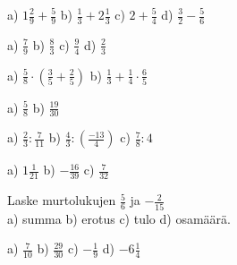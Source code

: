 \begin{tehtava}
a) $1\frac{2}{9}+\frac{5}{9}$ \qquad b) $\frac{1}{3}+2\frac{1}{3}$ \qquad c) $2+\frac{5}{4}$ \qquad
d) $ \frac{3}{2}-\frac{5}{6}$
\begin{vastaus}
a) $\frac{7}{9}$ \qquad b) $\frac{8}{3}$ \qquad c) $\frac{9}{4}$ \qquad d) $\frac{2}{3}$
\end{vastaus}
\end{tehtava}


\begin{tehtava}
a) $\frac{5}{8}\cdot(\frac{3}{5}+\frac{2}{5})$ \qquad b) $\frac{1}{3}+\frac{1}{4}\cdot\frac{6}{5}$
\begin{vastaus}
a) $\frac{5}{8}$ \qquad b) $\frac{19}{30}$
\end{vastaus}
\end{tehtava}


\begin{tehtava}
a) $\frac{2}{3} : \frac{7}{11}$ \qquad b) $\frac{4}{3}:(\frac{-13}{4})$ \qquad c) $\frac{7}{8}:4$
\begin{vastaus}
a) $1\frac{1}{21}$ \qquad b) $-\frac{16}{39}$ \qquad c) $\frac{7}{32}$
\end{vastaus}
\end{tehtava}

\begin{tehtava}
Laske murtolukujen $\frac{5}{6}$ ja $-\frac{2}{15}$ \\ a) summa \qquad b) erotus \qquad c) tulo \qquad d) osamäärä.
\begin{vastaus}
a) $\frac{7}{10}$ \qquad b) $\frac{29}{30}$ \qquad c) $-\frac{1}{9}$ \qquad d) $-6\frac{1}{4}$
\end{vastaus}
\end{tehtava}


